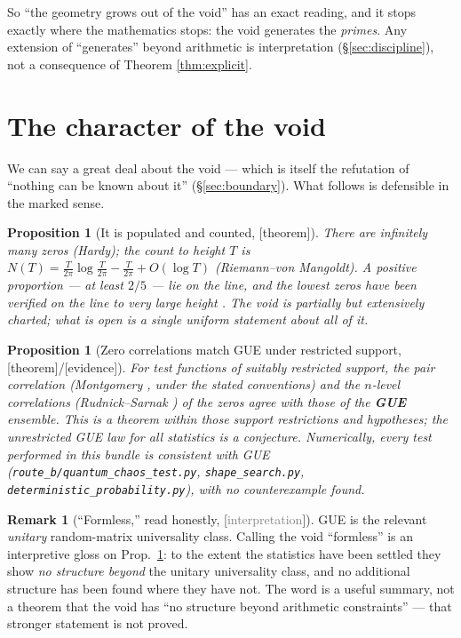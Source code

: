 \documentclass[11pt,a4paper]{article}
\newtheorem{proposition}[theorem]{Proposition}
\theoremstyle{definition}
\newtheorem{remark}[theorem]{Remark}
\newcommand{\TAGthm}{{\small\textsf{[\textcolor{green!45!black}{theorem}]}}}
\newcommand{\TAGev}{{\small\textsf{[\textcolor{orange!80!black}{evidence}]}}}
\newcommand{\TAGphil}{{\small\textsf{[\textcolor{gray}{interpretation}]}}}
\begin{document}
So ``the geometry grows out of the void'' has an exact reading, and it stops
exactly where the mathematics stops: the void generates the \emph{primes}.
Any extension of ``generates'' beyond arithmetic is interpretation
(\S\ref{sec:discipline}), not a consequence of Theorem \ref{thm:explicit}.

\section{The character of the void}\label{sec:character}

We can say a great deal about the void --- which is itself the refutation of
``nothing can be known about it'' (\S\ref{sec:boundary}). What follows is
defensible in the marked sense.

\begin{proposition}[It is populated and counted, \TAGthm]\label{prop:counted}
There are infinitely many zeros (Hardy); the count to height $T$ is
$N(T)=\frac{T}{2\pi}\log\frac{T}{2\pi}-\frac{T}{2\pi}+O(\log T)$
(Riemann--von Mangoldt). A positive proportion --- at least $2/5$
\cite{Conrey} --- lie on the line, and the lowest zeros have been verified on
the line to very large height \cite{Platt,Gourdon}. The void is partially but
extensively charted; what is open is a single uniform statement about
\emph{all} of it.
\end{proposition}

\begin{proposition}[Zero correlations match GUE under restricted support,
\TAGthm/\TAGev]\label{prop:formless}
For test functions of suitably restricted support, the pair correlation
(Montgomery \cite{Montgomery}, under the stated conventions) and the $n$-level
correlations (Rudnick--Sarnak \cite{RudnickSarnak}) of the zeros agree with
those of the \textbf{GUE} ensemble. This is a theorem \emph{within those
support restrictions and hypotheses}; the unrestricted GUE law for all
statistics is a conjecture. Numerically, every test performed in this bundle
is consistent with GUE (\texttt{route\_b/quantum\_chaos\_test.py},
\texttt{shape\_search.py}, \texttt{deterministic\_probability.py}), with no
counterexample found.
\end{proposition}

\begin{remark}[``Formless,'' read honestly, \TAGphil]\label{rem:formless}
GUE is the relevant \emph{unitary} random-matrix universality class. Calling
the void ``formless'' is an interpretive gloss on Prop.\ \ref{prop:formless}:
to the extent the statistics have been settled they show \emph{no structure
beyond} the unitary universality class, and no additional structure has been
found where they have not. The word is a useful summary, not a theorem that
the void has ``no structure beyond arithmetic constraints'' --- that stronger
statement is not proved.
\end{remark}
\end{document}
